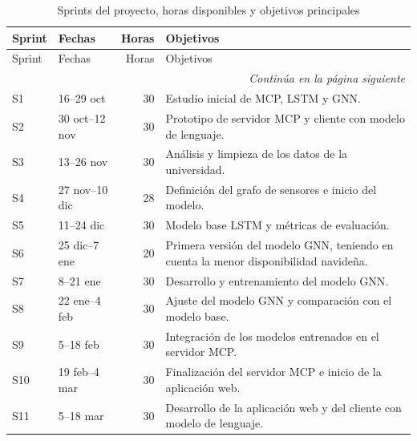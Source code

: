 \begin{longtable}{l l r p{7cm}}

\caption{Sprints del proyecto, horas disponibles y objetivos principales}
\label{tabla:sprints}\\

\toprule
Sprint & Fechas & Horas & Objetivos \\
\midrule
\endfirsthead

\toprule
Sprint & Fechas & Horas & Objetivos \\
\midrule
\endhead

\midrule
\multicolumn{4}{r}{%
    \small\textit{Continúa en la página siguiente}%
} \\
\endfoot

\bottomrule
\endlastfoot

S1 & 16--29 oct & 30 &
Estudio inicial de MCP, LSTM y GNN. \\

S2 & 30 oct--12 nov & 30 &
Prototipo de servidor MCP y cliente con modelo de lenguaje. \\

S3 & 13--26 nov & 30 &
Análisis y limpieza de los datos de la universidad. \\

S4 & 27 nov--10 dic & 28 &
Definición del grafo de sensores e inicio del modelo. \\

S5 & 11--24 dic & 30 &
Modelo base LSTM y métricas de evaluación. \\

S6 & 25 dic--7 ene & 20 &
Primera versión del modelo GNN, teniendo en cuenta la menor disponibilidad navideña. \\

S7 & 8--21 ene & 30 &
Desarrollo y entrenamiento del modelo GNN. \\

S8 & 22 ene--4 feb & 30 &
Ajuste del modelo GNN y comparación con el modelo base. \\

S9 & 5--18 feb & 30 &
Integración de los modelos entrenados en el servidor MCP. \\

S10 & 19 feb--4 mar & 30 &
Finalización del servidor MCP e inicio de la aplicación web. \\

S11 & 5--18 mar & 30 &
Desarrollo de la aplicación web y del cliente con modelo de lenguaje. \\


\end{longtable}
